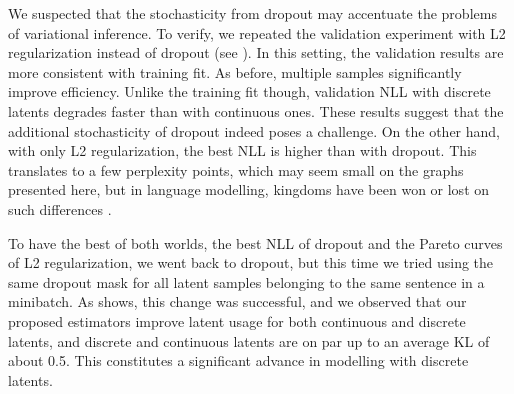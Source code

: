 We suspected that the stochasticity from dropout may accentuate the problems of variational inference.
To verify, we repeated the validation experiment with L2 regularization instead of dropout (see ).
In this setting, the validation results are more consistent with training fit. As before, multiple samples significantly improve efficiency.
Unlike the training fit though, validation NLL with discrete latents degrades faster than with continuous ones.
These results suggest that the additional stochasticity of dropout indeed poses a challenge.
On the other hand, with only L2 regularization, the best NLL is higher than with dropout.
This translates to a few perplexity points, which may seem small on the graphs presented here, but in language modelling, kingdoms have been won or lost on such differences \citep{merity2017regularizing}.

To have the best of both worlds, the best NLL of dropout and the Pareto curves of L2 regularization, we went back to dropout, but this time we tried using the same dropout mask for all latent samples belonging to the same sentence in a minibatch.
As  shows, this change was successful, and we observed that our proposed estimators improve latent usage for both continuous and discrete latents, and discrete and continuous latents are on par up to an average KL of about 0.5.
This constitutes a significant advance in modelling with discrete latents.

